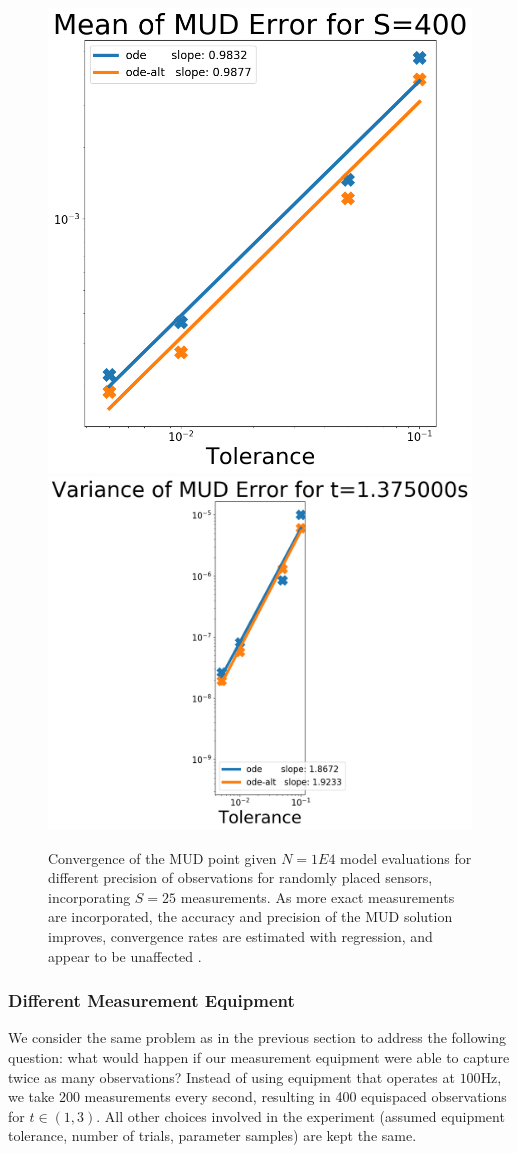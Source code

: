 \begin{figure}[htbp]
  \centering
  \includegraphics[width=0.475\linewidth]{figures/ode/ode_convergence_mud_std_mean}
  \includegraphics[width=0.475\linewidth]{figures/ode/ode_convergence_mud_std_var}

  \caption{Convergence of the MUD point given $N=1E4$ model evaluations for different precision of observations for randomly placed sensors, incorporating $S=25$ measurements.
  As more exact measurements are incorporated, the accuracy and precision of the MUD solution improves, convergence rates are estimated with regression, and appear to be unaffected .
  }
  \label{fig:ode-convergence-std}
\end{figure}




\subsubsection{Different Measurement Equipment}

We consider the same problem as in the previous section to address the following question: what would happen if our measurement equipment were able to capture twice as many observations?
Instead of using equipment that operates at $100$Hz, we take $200$ measurements every second, resulting in 400 equispaced observations for $t \in (1,3)$.
All other choices involved in the experiment (assumed equipment tolerance, number of trials, parameter samples) are kept the same.

